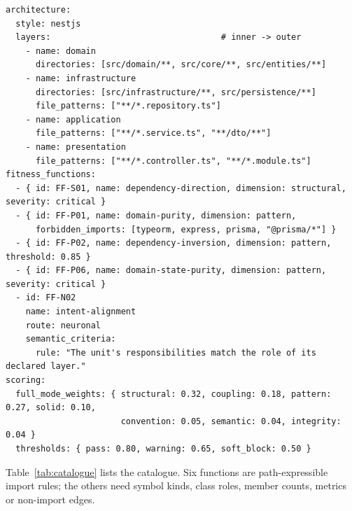 \documentclass[10pt,a4paper]{article}
\begin{document}
\begin{lstlisting}[style=yaml,caption={Abbreviated NestJS preset (\texttt{presets/nestjs.yaml}).},label={lst:spec},float=t]
architecture:
  style: nestjs
  layers:                                  # inner -> outer
    - name: domain
      directories: [src/domain/**, src/core/**, src/entities/**]
    - name: infrastructure
      directories: [src/infrastructure/**, src/persistence/**]
      file_patterns: ["**/*.repository.ts"]
    - name: application
      file_patterns: ["**/*.service.ts", "**/dto/**"]
    - name: presentation
      file_patterns: ["**/*.controller.ts", "**/*.module.ts"]
fitness_functions:
  - { id: FF-S01, name: dependency-direction, dimension: structural, severity: critical }
  - { id: FF-P01, name: domain-purity, dimension: pattern,
      forbidden_imports: [typeorm, express, prisma, "@prisma/*"] }
  - { id: FF-P02, name: dependency-inversion, dimension: pattern, threshold: 0.85 }
  - { id: FF-P06, name: domain-state-purity, dimension: pattern, severity: critical }
  - id: FF-N02
    name: intent-alignment
    route: neuronal
    semantic_criteria:
      rule: "The unit's responsibilities match the role of its declared layer."
scoring:
  full_mode_weights: { structural: 0.32, coupling: 0.18, pattern: 0.27, solid: 0.10,
                       convention: 0.05, semantic: 0.04, integrity: 0.04 }
  thresholds: { pass: 0.80, warning: 0.65, soft_block: 0.50 }
\end{lstlisting}

Table~\ref{tab:catalogue} lists the catalogue. Six functions are path-expressible import rules; the others need
symbol kinds, class roles, member counts, metrics or non-import edges. %
\end{document}
